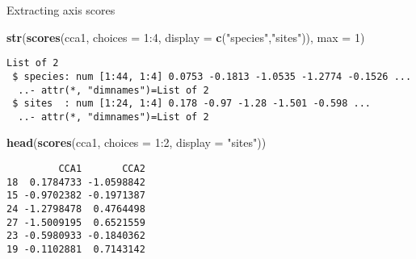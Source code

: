 \documentclass[10pt,ignorenonframetext,compress, aspectratio=169]{beamer}
\newenvironment{Shaded}{\begin{snugshade}}{\end{snugshade}}
\newcommand{\KeywordTok}[1]{\textcolor[rgb]{0.13,0.29,0.53}{\textbf{{#1}}}}
\newcommand{\DataTypeTok}[1]{\textcolor[rgb]{0.13,0.29,0.53}{{#1}}}
\newcommand{\DecValTok}[1]{\textcolor[rgb]{0.00,0.00,0.81}{{#1}}}
\newcommand{\StringTok}[1]{\textcolor[rgb]{0.31,0.60,0.02}{{#1}}}
\newcommand{\NormalTok}[1]{{#1}}
\begin{document}
\begin{frame}[fragile]{Extracting axis scores}

\scriptsize

\begin{Shaded}
\begin{Highlighting}[]
\KeywordTok{str}\NormalTok{(}\KeywordTok{scores}\NormalTok{(cca1, }\DataTypeTok{choices =} \DecValTok{1}\NormalTok{:}\DecValTok{4}\NormalTok{, }\DataTypeTok{display =} \KeywordTok{c}\NormalTok{(}\StringTok{"species"}\NormalTok{,}\StringTok{"sites"}\NormalTok{)), }\DataTypeTok{max =} \DecValTok{1}\NormalTok{)}
\end{Highlighting}
\end{Shaded}

\begin{verbatim}
List of 2
 $ species: num [1:44, 1:4] 0.0753 -0.1813 -1.0535 -1.2774 -0.1526 ...
  ..- attr(*, "dimnames")=List of 2
 $ sites  : num [1:24, 1:4] 0.178 -0.97 -1.28 -1.501 -0.598 ...
  ..- attr(*, "dimnames")=List of 2
\end{verbatim}

\begin{Shaded}
\begin{Highlighting}[]
\KeywordTok{head}\NormalTok{(}\KeywordTok{scores}\NormalTok{(cca1, }\DataTypeTok{choices =} \DecValTok{1}\NormalTok{:}\DecValTok{2}\NormalTok{, }\DataTypeTok{display =} \StringTok{"sites"}\NormalTok{))}
\end{Highlighting}
\end{Shaded}

\begin{verbatim}
         CCA1       CCA2
18  0.1784733 -1.0598842
15 -0.9702382 -0.1971387
24 -1.2798478  0.4764498
27 -1.5009195  0.6521559
23 -0.5980933 -0.1840362
19 -0.1102881  0.7143142
\end{verbatim}

\normalsize

\end{frame}
\end{document}
